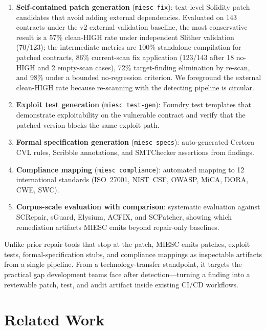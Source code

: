 \documentclass[conference]{IEEEtran}
\begin{document}
\begin{enumerate}
    \item \textbf{Self-contained patch generation} (\texttt{miesc fix}): text-level Solidity patch candidates that avoid adding external dependencies. Evaluated on 143 contracts under the v2 external-validation baseline, the most conservative result is a 57\% clean-HIGH rate under independent Slither validation (70/123); the intermediate metrics are 100\% standalone compilation for patched contracts, 86\% current-scan fix application (123/143 after 18 no-HIGH and 2 empty-scan cases), 72\% target-finding elimination by re-scan, and 98\% under a bounded no-regression criterion. We foreground the external clean-HIGH rate because re-scanning with the detecting pipeline is circular.
    \item \textbf{Exploit test generation} (\texttt{miesc test-gen}): Foundry test templates that demonstrate exploitability on the vulnerable contract and verify that the patched version blocks the same exploit path.
    \item \textbf{Formal specification generation} (\texttt{miesc specs}): auto-generated Certora CVL rules, Scribble annotations, and SMTChecker assertions from findings.
    \item \textbf{Compliance mapping} (\texttt{miesc compliance}): automated mapping to 12 international standards (ISO~27001, NIST~CSF, OWASP, MiCA, DORA, CWE, SWC).
    \item \textbf{Corpus-scale evaluation with comparison}: systematic evaluation against SCRepair, sGuard, Elysium, ACFIX, and SCPatcher, showing which remediation artifacts MIESC emits beyond repair-only baselines.
\end{enumerate}

Unlike prior repair tools that stop at the patch, MIESC emits patches, exploit tests, formal-specification stubs, and compliance mappings as inspectable artifacts from a single pipeline. From a technology-transfer standpoint, it targets the practical gap development teams face after detection---turning a finding into a reviewable patch, test, and audit artifact inside existing CI/CD workflows.

\section{Related Work}
\end{document}
